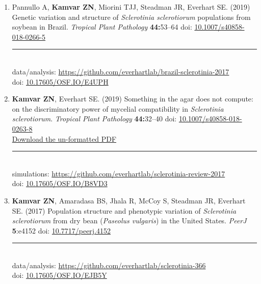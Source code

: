 \begin{enumerate}[leftmargin = 14pt]
	\vspace{3pt}
  
  \item Pannullo A, \textbf{Kamvar ZN}, Miorini TJJ, Steadman JR, Everhart SE.
    (2019) Genetic variation and structure of \textit{Sclerotinia sclerotiorum}
    populations from soybean in Brazil. \textit{Tropical Plant Pathology} \textbf{44:}53--64 doi:
    \href{https://doi.org/10.1007/s40858-018-0266-5}{10.1007/s40858-018-0266-5}\\
	\rule[0.25\baselineskip]{0.25\textwidth}{0.5pt}\\
  data/analysis: \href{https://github.com/everhartlab/brazil-sclerotinia-2017#readme}{https://github.com/everhartlab/brazil-sclerotinia-2017}\\
  doi:\phantom{t/analysis:}  \href{https://doi.org/10.17605/OSF.IO/E4UPH}{10.17605/OSF.IO/E4UPH} 

	\vspace{3pt}
  
  \item \textbf{Kamvar ZN}, Everhart SE. (2019) Something in the agar does not
    compute: on the discriminatory power of mycelial compatibility in
    \textit{Sclerotinia sclerotiorum}. \textit{Tropical Plant Pathology} \textbf{44:}32--40  doi:
    \href{https://doi.org/10.1007/s40858-018-0263-8}{10.1007/s40858-018-0263-8}\\
    \href{https://github.com/everhartlab/sclerotinia-review-2017/raw/master/manuscript/review.pdf}{Download the un-formatted PDF}\\
	\rule[0.25\baselineskip]{0.25\textwidth}{0.5pt}\\
  simulations: \href{https://github.com/everhartlab/sclerotinia-review-2017#readme}{https://github.com/everhartlab/sclerotinia-review-2017}\\
    doi:\phantom{mlatons:} \href{https://doi.org/10.17605/OSF.IO/B8VD3}{10.17605/OSF.IO/B8VD3} 

	\vspace{3pt}
  
	\item \textbf{Kamvar ZN}, Amaradasa BS, Jhala R, McCoy S, Steadman JR,
	Everhart SE. (2017) Population structure and phenotypic variation of
	\textit{Sclerotinia sclerotiorum} from dry bean (\textit{Paseolus vulgaris})
	in the United States. \textit{PeerJ} \textbf{5}:e4152 doi: \href{https://doi.org/10.7717/peerj.4152}{10.7717/peerj.4152}\\
	\rule[0.25\baselineskip]{0.25\textwidth}{0.5pt}\\
	data/analysis: \href{https://github.com/everhartlab/sclerotinia-366#readme}{https://github.com/everhartlab/sclerotinia-366}\\
	doi:\phantom{t/analysis:}
	\href{https://doi.org/10.17605/OSF.IO/EJB5Y}{10.17605/OSF.IO/EJB5Y}


\end{enumerate}
